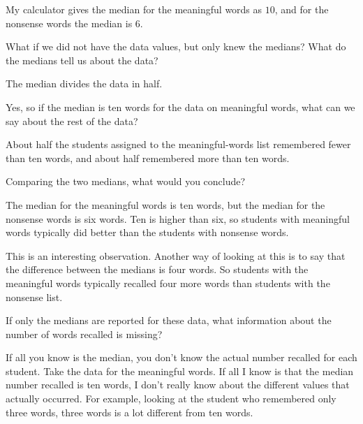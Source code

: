 {\begin{scriptlist}
      \item [Student D:] My calculator gives the median for the meaningful words as $10$, and for the nonsense words the median is $6$. 
      
      \item [Teacher:] What if we did not have the data values, but only knew the medians? What do the medians tell us about the data?
      
      \item [Student D:] The median divides the data in half.
      
      \item [Teacher:] Yes, so if the median is ten words for the data on meaningful words, what can we say about the rest of the data?
      
      \item [Student F:] About half the students assigned to the meaningful-words list remembered fewer than ten words, and about half remembered more than ten words.
      
      \item [Teacher:] Comparing the two medians, what would you conclude?
      
      \item [Student F:] The median for the meaningful words is ten words, but the median for the nonsense words is six words. Ten is higher than six, so students with meaningful words typically did better than the students with nonsense words.
      
      \item [Teacher:] This is an interesting observation. Another way of looking at this is to say that the difference between the medians is four words. So students with the meaningful words typically recalled four more words than students with the nonsense list.
      
      \item [Teacher:] If only the medians are reported for these data, what information about the number of words recalled is missing?
      
      \item [Student G:] If all you know is the median, you don't know the actual number recalled for each student. Take the data for the meaningful words. If all I know is that the median number recalled is ten words, I don't really know about the different values that actually occurred. For example, looking at the student who remembered only three words, three words is a lot different from ten words.
      

\end{scriptlist}}
